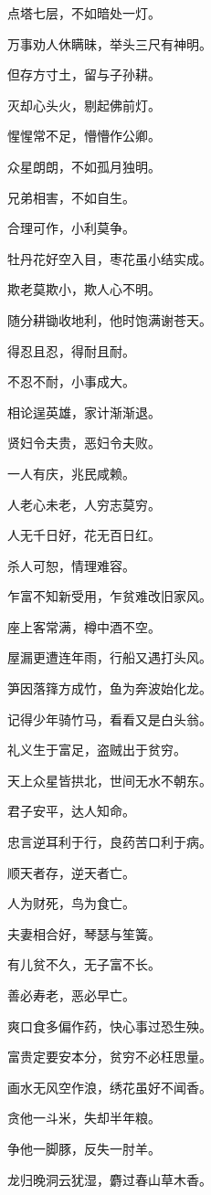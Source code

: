 \documentclass[12pt,oneside]{book}
\begin{document}
点塔七层，不如暗处一灯。

万事劝人休瞒昧，举头三尺有神明。

但存方寸土，留与子孙耕。

灭却心头火，剔起佛前灯。

惺惺常不足，懵懵作公卿。

众星朗朗，不如孤月独明。

兄弟相害，不如自生。

合理可作，小利莫争。

牡丹花好空入目，枣花虽小结实成。

欺老莫欺小，欺人心不明。

随分耕锄收地利，他时饱满谢苍天。

得忍且忍，得耐且耐。

不忍不耐，小事成大。

相论逞英雄，家计渐渐退。

贤妇令夫贵，恶妇令夫败。

一人有庆，兆民咸赖。

人老心未老，人穷志莫穷。

人无千日好，花无百日红。

杀人可恕，情理难容。

乍富不知新受用，乍贫难改旧家风。

座上客常满，樽中酒不空。

屋漏更遭连年雨，行船又遇打头风。

笋因落箨方成竹，鱼为奔波始化龙。

记得少年骑竹马，看看又是白头翁。

礼义生于富足，盗贼出于贫穷。

天上众星皆拱北，世间无水不朝东。

君子安平，达人知命。

忠言逆耳利于行，良药苦口利于病。

顺天者存，逆天者亡。

人为财死，鸟为食亡。

夫妻相合好，琴瑟与笙簧。

有儿贫不久，无子富不长。

善必寿老，恶必早亡。

爽口食多偏作药，快心事过恐生殃。

富贵定要安本分，贫穷不必枉思量。

画水无风空作浪，绣花虽好不闻香。

贪他一斗米，失却半年粮。

争他一脚豚，反失一肘羊。

龙归晚洞云犹湿，麝过春山草木香。
\end{document}
